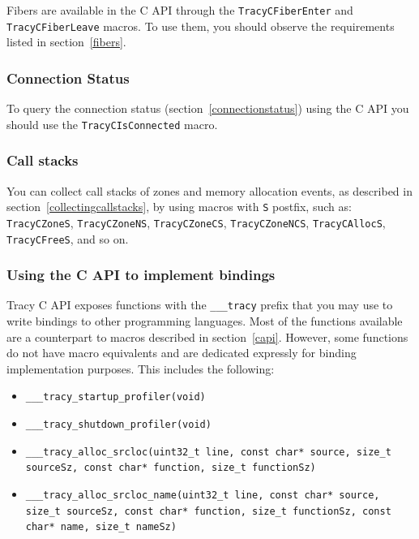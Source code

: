 \documentclass[hidelinks,titlepage,a4paper]{article}
\begin{document}
Fibers are available in the C API through the \texttt{TracyCFiberEnter} and \texttt{TracyCFiberLeave} macros. To use them, you should observe the requirements listed in section~\ref{fibers}.

\subsubsection{Connection Status}

To query the connection status (section~\ref{connectionstatus}) using the C API you should use the \texttt{TracyCIsConnected} macro.

\subsubsection{Call stacks}

You can collect call stacks of zones and memory allocation events, as described in section~\ref{collectingcallstacks}, by using macros with \texttt{S} postfix, such as: \texttt{TracyCZoneS}, \texttt{TracyCZoneNS}, \texttt{TracyCZoneCS}, \texttt{TracyCZoneNCS}, \texttt{TracyCAllocS}, \texttt{TracyCFreeS}, and so on.

\subsubsection{Using the C API to implement bindings}
\label{capibindings}

Tracy C API exposes functions with the \texttt{\_\_\_tracy} prefix that you may use to write bindings to other programming languages. Most of the functions available are a counterpart to macros described in section~\ref{capi}. However, some functions do not have macro equivalents and are dedicated expressly for binding implementation purposes. This includes the following:

\begin{itemize}
\item \texttt{\_\_\_tracy\_startup\_profiler(void)}
\item \texttt{\_\_\_tracy\_shutdown\_profiler(void)}
\item \texttt{\_\_\_tracy\_alloc\_srcloc(uint32\_t line, const char* source, size\_t sourceSz, const char* function, size\_t functionSz)}
\item \texttt{\_\_\_tracy\_alloc\_srcloc\_name(uint32\_t line, const char* source, size\_t sourceSz, const char* function, size\_t functionSz, const char* name, size\_t nameSz)}
\end{itemize}
\end{document}
